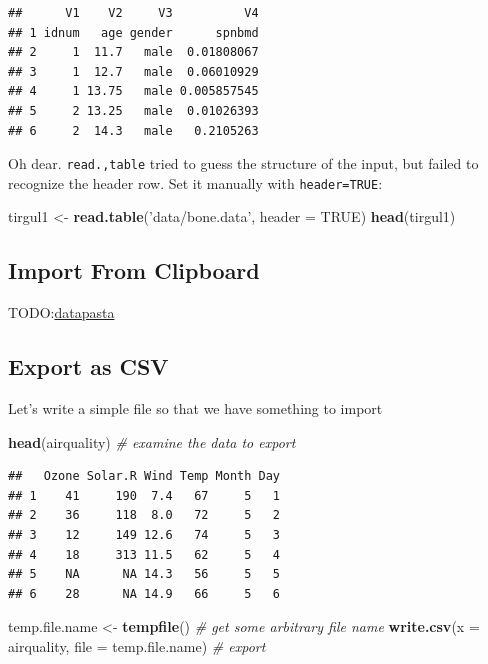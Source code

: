 \documentclass[]{book}
\newenvironment{Shaded}{\begin{snugshade}}{\end{snugshade}}
\newcommand{\KeywordTok}[1]{\textcolor[rgb]{0.13,0.29,0.53}{\textbf{#1}}}
\newcommand{\DataTypeTok}[1]{\textcolor[rgb]{0.13,0.29,0.53}{#1}}
\newcommand{\StringTok}[1]{\textcolor[rgb]{0.31,0.60,0.02}{#1}}
\newcommand{\CommentTok}[1]{\textcolor[rgb]{0.56,0.35,0.01}{\textit{#1}}}
\newcommand{\OtherTok}[1]{\textcolor[rgb]{0.56,0.35,0.01}{#1}}
\newcommand{\NormalTok}[1]{#1}
\theoremstyle{definition}
\theoremstyle{definition}
\theoremstyle{definition}
\theoremstyle{remark}
\begin{document}
\begin{verbatim}
##      V1    V2     V3          V4
## 1 idnum   age gender      spnbmd
## 2     1  11.7   male  0.01808067
## 3     1  12.7   male  0.06010929
## 4     1 13.75   male 0.005857545
## 5     2 13.25   male  0.01026393
## 6     2  14.3   male   0.2105263
\end{verbatim}

Oh dear. \texttt{read.,table} tried to guess the structure of the input,
but failed to recognize the header row. Set it manually with
\texttt{header=TRUE}:

\begin{Shaded}
\begin{Highlighting}[]
\NormalTok{tirgul1 <-}\StringTok{ }\KeywordTok{read.table}\NormalTok{(}\StringTok{'data/bone.data'}\NormalTok{, }\DataTypeTok{header =} \OtherTok{TRUE}\NormalTok{) }
\KeywordTok{head}\NormalTok{(tirgul1)}
\end{Highlighting}
\end{Shaded}

\subsection{Import From Clipboard}\label{import-from-clipboard}

TODO:\href{https://github.com/MilesMcBain/datapasta}{datapasta}

\subsection{Export as CSV}\label{export-as-csv}

Let's write a simple file so that we have something to import

\begin{Shaded}
\begin{Highlighting}[]
\KeywordTok{head}\NormalTok{(airquality) }\CommentTok{#  examine the data to export}
\end{Highlighting}
\end{Shaded}

\begin{verbatim}
##   Ozone Solar.R Wind Temp Month Day
## 1    41     190  7.4   67     5   1
## 2    36     118  8.0   72     5   2
## 3    12     149 12.6   74     5   3
## 4    18     313 11.5   62     5   4
## 5    NA      NA 14.3   56     5   5
## 6    28      NA 14.9   66     5   6
\end{verbatim}

\begin{Shaded}
\begin{Highlighting}[]
\NormalTok{temp.file.name <-}\StringTok{ }\KeywordTok{tempfile}\NormalTok{() }\CommentTok{# get some arbitrary file name}
\KeywordTok{write.csv}\NormalTok{(}\DataTypeTok{x =}\NormalTok{ airquality, }\DataTypeTok{file =}\NormalTok{ temp.file.name) }\CommentTok{# export}
\end{Highlighting}
\end{Shaded}
\end{document}
